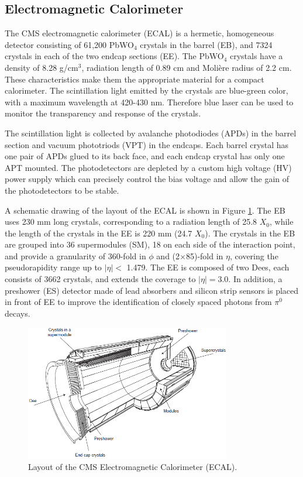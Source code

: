 \documentclass[thesis.tex]{subfiles}
\begin{document}
\subsection{Electromagnetic Calorimeter}
The CMS electromagnetic calorimeter (ECAL) is a hermetic, homogeneous detector consisting of 61,200 PbWO$_4$ crystals in the barrel (EB), and 7324 crystals in each of the two endcap sections (EE). 
The PbWO$_4$ crystals have a density of 8.28 g/cm$^3$, radiation length of 0.89 cm and Moli\`ere radius of 2.2 cm. 
These characteristics make them the appropriate material for a compact calorimeter. 
The scintillation light emitted by the crystals are blue-green color, with a maximum wavelength at 420-430 nm. 
Therefore blue laser can be used to monitor the transparency and response of the crystals. 

The scintillation light is collected by avalanche photodiodes (APDs) in the barrel section and vacuum phototriods (VPT) in the endcaps. 
Each barrel crystal has one pair of APDs glued to its back face, and each endcap crystal has only one APT mounted. 
The photodetectors are depleted by a custom high voltage (HV) power supply which can precisely control the bias voltage and allow the gain of the photodetectors to be stable. 

A schematic drawing of the layout of the ECAL is shown in Figure \ref{fig:ecalall}. 
The EB uses 230 mm long crystals, corresponding to a radiation length of 25.8 $X_0$, while the length of the crystals in the EE is 220 mm (24.7 $X_0$). 
The crystals in the EB are grouped into 36 supermodules (SM), 18 on each side of the interaction point, and provide a granularity of 360-fold in $\phi$ and (2$\times$85)-fold in $\eta$, covering the pseudorapidity range up to $|\eta| <$ 1.479. 
The EE is composed of two Dees, each consists of 3662 crystals, and extends the coverage to $|\eta| = $3.0. 
In addition, a preshower (ES) detector made of lead absorbers and silicon strip sensors is placed in front of EE to improve the identification of closely spaced photons from $\pi^0$ decays. 

\begin{figure}[hbt]
	\centering
	\includegraphics[width=0.8\textwidth]{Fig/The-CMS-Electromagnetic-Calorimeter-ECAL-The-barrel-section-comprises-36.png}
	\caption{Layout of the CMS Electromagnetic Calorimeter (ECAL).}
	\label{fig:ecalall}
\end{figure}
\end{document}
